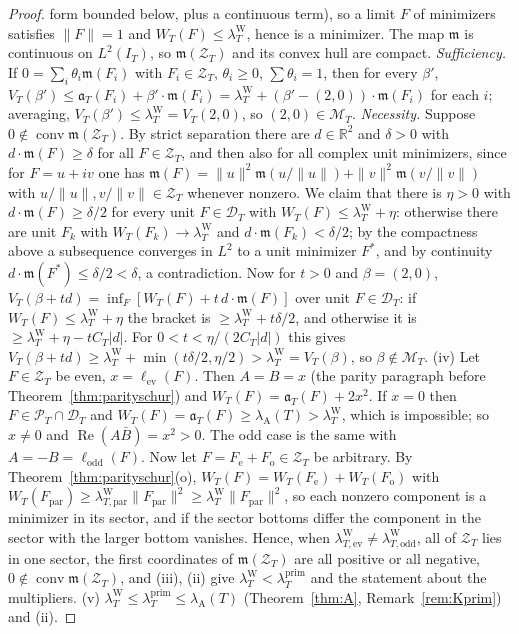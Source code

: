 \documentclass[11pt]{amsart}
\theoremstyle{definition}
\theoremstyle{remark}
\newcommand{\R}{\mathbb R}
\newcommand{\Rel}{\operatorname{Re}}
\newcommand{\PT}{\mathcal P_T}
\newcommand{\IT}{I_T}
\newcommand{\lamP}{\lambda^{\mathrm{prim}}_T}
\newcommand{\lamW}{\lambda^{\mathrm W}_T}
\newcommand{\lamA}{\lambda_{\mathrm A}(T)}
\begin{document}
\begin{proof}
form bounded below, plus a continuous term), so a limit $F$ of minimizers satisfies $\|F\|=1$ and
$W_T(F)\le\lamW$, hence is a minimizer. The map $\mathfrak m$ is continuous on $L^2(\IT)$, so
$\mathfrak m(\mathcal Z_T)$ and its convex hull are compact.
\emph{Sufficiency.} If $0=\sum_i\theta_i\mathfrak m(F_i)$ with $F_i\in\mathcal Z_T$, $\theta_i\ge0$, $\sum\theta_i=1$, then for
every $\beta'$, $V_T(\beta')\le\mathfrak a_T(F_i)+\beta'\cdot\mathfrak m(F_i)=\lamW+(\beta'-(2,0))\cdot\mathfrak m(F_i)$ for each $i$;
averaging, $V_T(\beta')\le\lamW=V_T(2,0)$, so $(2,0)\in\mathcal M_T$.
\emph{Necessity.} Suppose $0\notin\operatorname{conv}\mathfrak m(\mathcal Z_T)$. By strict separation there are $d\in\R^2$ and
$\delta>0$ with $d\cdot\mathfrak m(F)\ge\delta$ for all $F\in\mathcal Z_T$, and then also for all complex unit minimizers,
since for $F=u+iv$ one has $\mathfrak m(F)=\|u\|^2\mathfrak m(u/\|u\|)+\|v\|^2\mathfrak m(v/\|v\|)$ with $u/\|u\|,v/\|v\|\in\mathcal Z_T$
whenever nonzero. We claim that there is $\eta>0$ with $d\cdot\mathfrak m(F)\ge\delta/2$ for every unit $F\in\mathcal D_T$
with $W_T(F)\le\lamW+\eta$: otherwise there are unit $F_k$ with $W_T(F_k)\to\lamW$ and $d\cdot\mathfrak m(F_k)<\delta/2$;
by the compactness above a subsequence converges in $L^2$ to a unit minimizer $F^*$, and by continuity
$d\cdot\mathfrak m(F^*)\le\delta/2<\delta$, a contradiction. Now for $t>0$ and $\beta=(2,0)$,
$V_T(\beta+td)=\inf_F[W_T(F)+t\,d\cdot\mathfrak m(F)]$ over unit $F\in\mathcal D_T$: if $W_T(F)\le\lamW+\eta$ the bracket is
$\ge\lamW+t\delta/2$, and otherwise it is $\ge\lamW+\eta-tC_T|d|$. For $0<t<\eta/(2C_T|d|)$ this gives
$V_T(\beta+td)\ge\lamW+\min(t\delta/2,\eta/2)>\lamW=V_T(\beta)$, so $\beta\notin\mathcal M_T$.
(iv) Let $F\in\mathcal Z_T$ be even, $x=\ell_{\mathrm{ev}}(F)$. Then $A=B=x$ (the parity paragraph before
Theorem~\ref{thm:parityschur}) and $W_T(F)=\mathfrak a_T(F)+2x^2$. If $x=0$ then $F\in\PT\cap\mathcal D_T$ and
$W_T(F)=\mathfrak a_T(F)\ge\lamA>\lamW$, which is impossible; so $x\ne0$ and $\Rel(A\bar B)=x^2>0$. The odd case is the
same with $A=-B=\ell_{\mathrm{odd}}(F)$. Now let $F=F_{\mathrm e}+F_{\mathrm o}\in\mathcal Z_T$ be arbitrary. By
Theorem~\ref{thm:parityschur}(o), $W_T(F)=W_T(F_{\mathrm e})+W_T(F_{\mathrm o})$ with
$W_T(F_{\mathrm{par}})\ge\lambda^{\mathrm W}_{T,\mathrm{par}}\|F_{\mathrm{par}}\|^2\ge\lamW\|F_{\mathrm{par}}\|^2$, so each nonzero component
is a minimizer in its sector, and if the sector bottoms differ the component in the sector with the larger bottom
vanishes. Hence, when $\lambda^{\mathrm W}_{T,\mathrm{ev}}\ne\lambda^{\mathrm W}_{T,\mathrm{odd}}$, all of $\mathcal Z_T$ lies in one
sector, the first coordinates of $\mathfrak m(\mathcal Z_T)$ are all positive or all negative, $0\notin\operatorname{conv}\mathfrak m(\mathcal Z_T)$,
and (iii), (ii) give $\lamW<\lamP$ and the statement about the multipliers.
(v) $\lamW\le\lamP\le\lamA$ (Theorem~\ref{thm:A}, Remark~\ref{rem:Kprim}) and (ii).
\end{proof}
\end{document}
